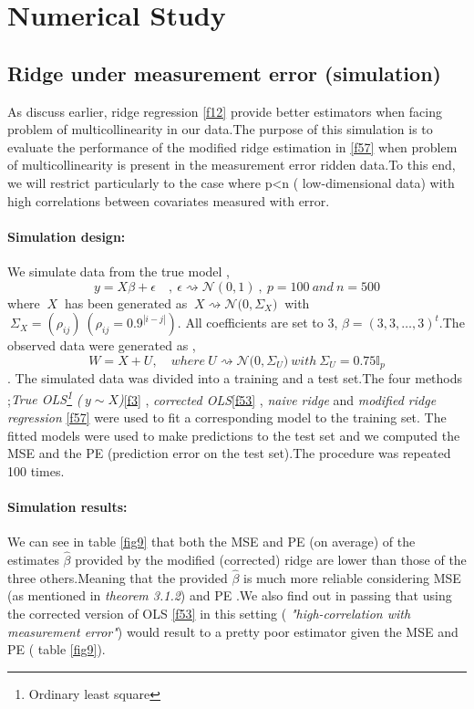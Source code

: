 \documentclass[12pt]{report}
\begin{document}
\section{Numerical Study}
\subsection{Ridge under measurement error (simulation) }
{\small As discuss earlier, ridge regression \eqref{f12} provide better estimators when facing problem of multicollinearity in our data.The purpose of this simulation is to evaluate the performance of the modified ridge estimation in \eqref{f57} when problem of multicollinearity is present in the measurement error ridden data.To this end, we will restrict particularly to the case where p<n ( low-dimensional data) with high correlations between covariates measured with error.
	\paragraph{Simulation design:}
	We simulate data from the true model ,
	$$y=X\beta +\epsilon \quad ,\ \epsilon \rightsquigarrow \mathcal{N}(0,1)\ ,\ p=100\ and\ n=500$$
	where $\ X\ $ has been generated as $\ X\rightsquigarrow \mathcal{N}\big(0,\Sigma_{X} \big)\ $ with $\ \Sigma_{X}=(\rho_{ij})\  (\rho_{ij}=0.9^{|i-j|})$. All coefficients are set to 3, $\beta=(3,3,\dots,3)^{t}$.The observed data were generated as ,
	$$W=X+U,\quad where\ U\rightsquigarrow \mathcal{N}\big(0,\Sigma_{U} \big)\ with\ \Sigma_{U}=0.75\mathbb{I}_{p}$$.
	The simulated data was divided into a training and a test set.The four methods ;\textit{True OLS\footnote{Ordinary least square} ($\ y\sim X$)}\eqref{f3} , \textit{corrected OLS}\eqref{f53} , \textit{naive ridge} and \textit{modified ridge regression} \eqref{f57} were used to fit a corresponding model to the  training set. The fitted models were used to make predictions to the test set and we computed the MSE and the PE (prediction error on the test set).The procedure was repeated 100 times.
	\paragraph{Simulation results:}
	We can see in table \ref{fig9} that both the MSE and PE (on average) of the estimates $\hat{\beta}$ provided by the modified  (corrected) ridge are lower than those of the three others.Meaning that the provided $\hat{\beta}$ is much more reliable considering MSE (as mentioned in \textit{theorem 3.1.2}) and PE .We also find out in passing that using the corrected version of OLS \eqref{f53} in this setting ( \textit{"high-correlation with measurement error"}) would result to a pretty poor estimator given the MSE and PE ( table \ref{fig9}).}
\end{document}
